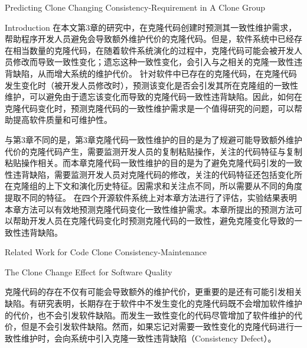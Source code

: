 
{Predicting Clone Changing Consistency-Requirement in A Clone Group}

{Introduction}
在本文第3章的研究中，在克隆代码创建时预测其一致性维护需求，帮助程序开发人员避免会导致额外维护代价的克隆代码。但是，软件系统中已经存在相当数量的克隆代码，在随着软件系统演化的过程中，克隆代码可能会被开发人员修改而导致一致性变化；遗忘这种一致性变化，会引入与之相关的克隆一致性违背缺陷，从而增大系统的维护代价。%
针对软件中已存在的克隆代码，在克隆代码发生变化时（被开发人员修改时），预测该变化是否会引发其所在克隆组的一致性维护，可以避免由于遗忘该变化而导致的克隆代码一致性违背缺陷。因此，如何在克隆代码变化时，预测克隆代码的一致性维护需求是一个值得研究的问题，可以帮助提高软件质量和可维护性。

与第3章不同的是，第3章克隆代码一致性维护的目的是为了规避可能导致额外维护代价的克隆代码产生，需要监测开发人员的复制粘贴操作，关注的代码特征与复制粘贴操作相关。而本章克隆代码一致性维护的目的是为了避免克隆代码引发的一致性违背缺陷，需要监测开发人员对克隆代码的修改，关注的代码特征还包括变化所在克隆组的上下文和演化历史特征。因需求和关注点不同，所以需要从不同的角度提取不同的特征。
在四个开源软件系统上对本章方法进行了评估，实验结果表明本章方法可以有效地预测克隆代码变化一致性维护需求。本章所提出的预测方法可以帮助开发人员在克隆代码变化时预测克隆代码的一致性，避免克隆变化导致的一致性违背缺陷。

{Related Work for Code Clone Consistency-Maintenance}

{The Clone Change Effect for Software Quality}

克隆代码的存在不仅有可能会导致额外的维护代价，更重要的是还有可能引发相关缺陷。有研究表明，长期存在于软件中不发生变化的克隆代码既不会增加软件维护的代价，也不会引发软件缺陷。而发生一致性变化的代码尽管增加了软件维护的代价，但是不会引发软件缺陷。然而，如果忘记对需要一致性变化的克隆代码进行一致性维护时，会向系统中引入克隆一致性违背缺陷（Consistency Defect）\cite{bettenburg2009empirical,juergens2009code}。

